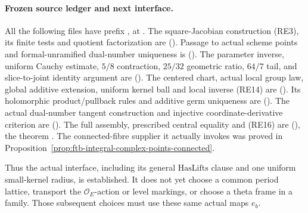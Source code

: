 \paragraph{Frozen source ledger and next interface.}
All the following files have prefix
,
at .
The square-Jacobian construction (RE3), its finite tests
and quotient factorization are
().
Passage to actual scheme points and formal-unramified
dual-number uniqueness is
().
The parameter inverse, uniform Cauchy estimate,
\(5/8\) contraction, \(25/32\) geometric ratio,
\(64/7\) tail, and slice-to-joint identity argument are
().
The centered chart, actual local group law, global
additive extension, uniform kernel ball and local inverse
(RE14) are
().
Its holomorphic product/pullback rules and additive germ
uniqueness are
().
The actual dual-number tangent construction and injective
coordinate-derivative criterion are
().
The full assembly, prescribed central equality and
(RE16) are 
(),
the theorem .
The connected-fibre supplier it actually invokes was
proved in
Proposition~\ref{prop:ftb-integral-complex-points-connected}.

Thus the actual 
interface, including its general \(\mathrm{HasLifts}\)
clause and one uniform small-kernel radius, is established.
It does not yet choose a common period lattice, transport
the \(\mathcal O_E\)-action or level markings, or choose a
theta frame in a family.  Those subsequent choices must
use these same actual maps \(e_b\).

